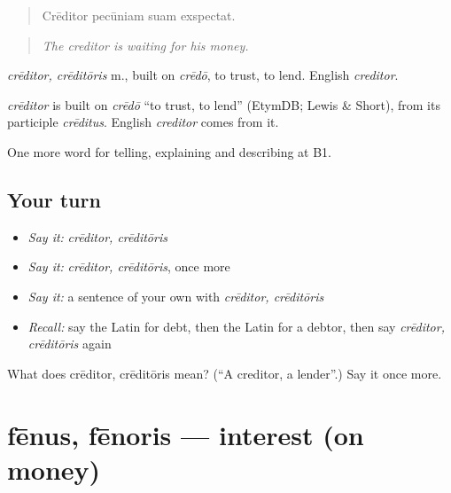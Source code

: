 \begin{quote}
Crēditor pecūniam suam exspectat.
\end{quote}

\begin{quote}
\emph{The creditor is waiting for his money.}
\end{quote}

\emph{crēditor, crēditōris} m., built on \emph{crēdō}, to trust, to lend. English \emph{creditor}.

\begin{cousinweb}
\emph{crēditor} is built on \emph{crēdō} \textquotedblleft{}to trust, to lend\textquotedblright{} (EtymDB; Lewis \& Short), from its participle \emph{crēditus}. English \emph{creditor} comes from it.
\end{cousinweb}

\begin{grammarlens}[title={What you've built}]
One more word for telling, explaining and describing at B1.
\end{grammarlens}

\subsection*{Your turn}
\begin{itemize}
\raggedright
  \item \emph{Say it:} \emph{crēditor, crēditōris}
  \item \emph{Say it:} \emph{crēditor, crēditōris}, once more
  \item \emph{Say it:} a sentence of your own with \emph{crēditor, crēditōris}
  \item \emph{Recall:} say the Latin for debt, then the Latin for a debtor, then say \emph{crēditor, crēditōris} again
\end{itemize}

\begin{tcolorbox}[breakable,colback=teal!4,colframe=teal!35!black,title={Before you move on}]
What does crēditor, crēditōris mean? (\textquotedblleft{}A creditor, a lender\textquotedblright{}.) Say it once more.
\end{tcolorbox}
\section[fēnus, fēnoris]{fēnus, fēnoris — interest (on money)}

\label{lesson:LA-C418-fenus}



